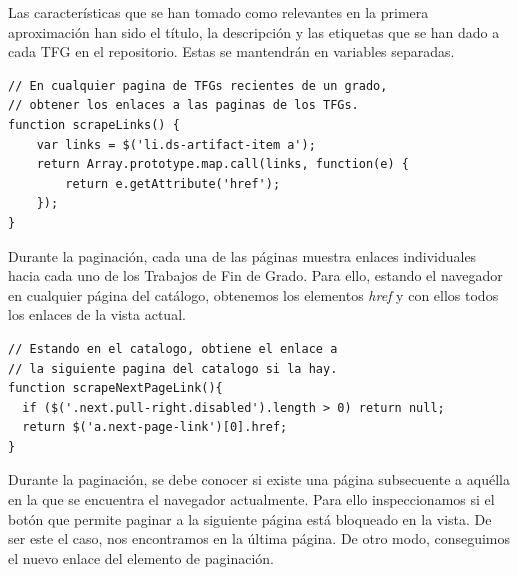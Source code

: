 Las características que se han tomado como relevantes en la primera aproximación han sido el título, la descripción y las etiquetas que se han dado a cada TFG en el repositorio. Estas se mantendrán en variables separadas. %

\begin{center}
\begin{minipage}{\linewidth}
\begin{lstlisting}[caption=Función de obtención de enlaces individuales.]
// En cualquier pagina de TFGs recientes de un grado,
// obtener los enlaces a las paginas de los TFGs.
function scrapeLinks() {
    var links = $('li.ds-artifact-item a');
    return Array.prototype.map.call(links, function(e) {
        return e.getAttribute('href');
    });
}
\end{lstlisting}
\end{minipage}
\end{center}

Durante la paginación, cada una de las páginas muestra enlaces individuales hacia cada uno de los Trabajos de Fin de Grado. Para ello, estando el navegador en cualquier página del catálogo, obtenemos los elementos \textit{href} y con ellos todos los enlaces de la vista actual. %

\begin{center}
\begin{minipage}{\linewidth}
\begin{lstlisting}[caption=Función de paginado.]
// Estando en el catalogo, obtiene el enlace a
// la siguiente pagina del catalogo si la hay.
function scrapeNextPageLink(){
  if ($('.next.pull-right.disabled').length > 0) return null;
  return $('a.next-page-link')[0].href;
}
\end{lstlisting}
\end{minipage}
\end{center}

Durante la paginación, se debe conocer si existe una página subsecuente a aquélla en la que se encuentra el navegador actualmente. Para ello inspeccionamos si el botón que permite paginar a la siguiente página está bloqueado en la vista. De ser este el caso, nos encontramos en la última página. De otro modo, conseguimos el nuevo enlace del elemento de paginación. %

